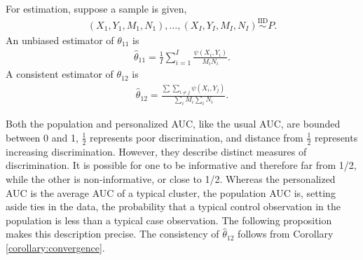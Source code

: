 \documentclass[12pt]{article}
\DeclareMathOperator{\AUC}{AUC}
\newcommand{\I}{I}
\renewcommand{\P}{P}
\newcommand{\cind}{\perp \!\!\! \perp}
\newcommand{\aucindiv}{\theta_{11}}%
\newcommand{\aucpop}{\theta_{12}}%
\newcommand{\aucindivhat}{\hat{\theta}_{11}}%
\newcommand{\aucpophat}{\hat{\theta}_{12}}%
\begin{document}
For estimation, suppose a sample is given,
\begin{align}
  (X_1,Y_1,M_1,N_1),\ldots,(X_\I,Y_\I,M_\I,N_\I) \overset{\text{IID}}{\sim} \P.
\end{align}
An unbiased estimator of $\aucindiv$ is
\begin{align}
  \aucindivhat = \frac{1}{I}\sum_{i=1}^\I \frac{\psi(X_i,Y_i)}{M_iN_i}. \label{defn:aucindivhat}
\end{align}
A consistent estimator of $\aucpop$ is
\begin{align}
  \aucpophat = \frac{\sum\sum_{i\neq j}\psi(X_i,Y_j)}{\sum_iM_i\sum_iN_i}. \label{defn:aucpophat}
\end{align}


Both the population and personalized AUC, like the usual AUC, are bounded
between 0 and 1, $\frac{1}{2}$ represents poor discrimination, and
distance from $\frac{1}{2}$ represents increasing
discrimination. However, they describe distinct measures of
discrimination. It is possible for one to be informative and therefore
far from 1/2, while the other is non-informative, or close to 1/2.
Whereas the personalized AUC is the average AUC of a typical cluster, the
population AUC is, setting aside ties in the data,
the probability that a typical control observation in the population
is less than a typical case observation. The following proposition makes this description precise. The consistency of $\aucpophat$ follows from Corollary \ref{corollary:convergence}.

\end{document}
